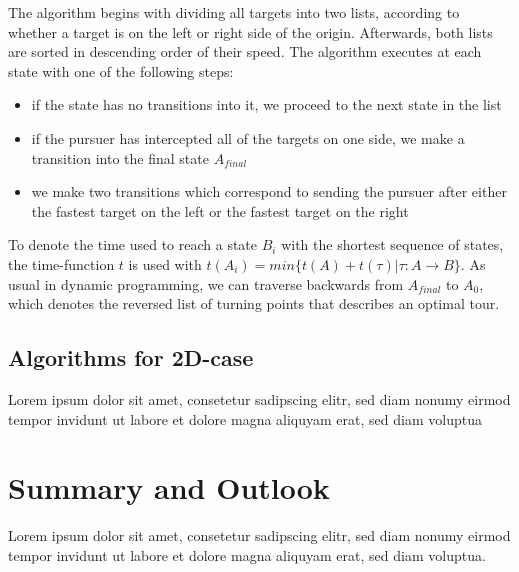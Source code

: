 \documentclass{acm_proc_article-sp}
\begin{document}
The algorithm begins with dividing all targets into two lists, according to whether a target is on the left or right side of the origin. Afterwards, both lists are sorted in descending order of their speed. The algorithm executes at each state with one of the following steps:
\begin{itemize}
\item
if the state has no transitions into it, we proceed to the next state in the list
\item
if the pursuer has intercepted all of the targets on one side, we make a transition into
the final state $A_{final}$
\item
we make two transitions which correspond to sending the pursuer after either the
fastest target on the left or the fastest target on the right

\end{itemize}

To denote the time used to reach a state $B_i$ with the shortest sequence of states, the time-function $t$ is used with $t(A_i)=min\{t(A)+t(\tau)|\tau:A\rightarrow B\}$. As usual in dynamic programming, we can traverse backwards from $A_{final}$ to $A_0$, which denotes the reversed list of turning points that describes an optimal tour.


\subsection{Algorithms for 2D-case}
Lorem ipsum dolor sit amet, consetetur sadipscing elitr, sed diam nonumy eirmod tempor invidunt ut labore et dolore magna aliquyam erat, sed diam voluptua

\section{Summary and Outlook}
Lorem ipsum dolor sit amet, consetetur sadipscing elitr, sed diam nonumy eirmod tempor invidunt ut labore et dolore magna aliquyam erat, sed diam voluptua.

{}

\end{document}
